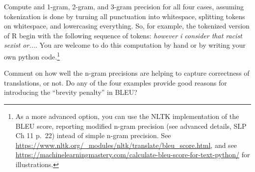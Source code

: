 \documentclass{article}
\begin{document}
Compute and 1-gram, 2-gram, and 3-gram precision for all four cases, assuming tokenization is done by turning all punctuation into whitespace, splitting tokens on whitespace, and lowercasing everything.  So, for example, the tokenized version of R begin with the following sequence of tokens: \emph{however i consider that racist sexist or...}.  You are welcome to do this computation by hand or by writing your own python code.\footnote{As a more advanced option, you can use the NLTK implementation of the BLEU score, reporting modified n-gram precision (see advanced details, SLP Ch 11 p.~22) intead of simple n-gram precision. See \url{https://www.nltk.org/_modules/nltk/translate/bleu_score.html}, and see \url{https://machinelearningmastery.com/calculate-bleu-score-for-text-python/} for illustrations.}

Comment on how well the n-gram precisions are helping to capture correctness of translations, or not.  Do any of the four examples provide good reasons for introducing the ``brevity penalty'' in BLEU?
\end{document}
